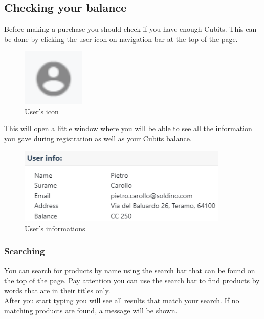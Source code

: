 		\subsection{Checking your balance}
		Before making a purchase you should check if you have enough Cubits\glo.
		This can be done by clicking the user icon on navigation bar at the top 
		of the page.
		\begin{figure}[H]
			\includegraphics[width=3cm]{res/images/user_icon.png}
			\centering
			\caption{User's icon}
		\end{figure}
		\noindent This will open a little window where you will be able to see 
		all the information you gave during registration as well as your Cubits 
		balance.
		\begin{figure}[H]
			\includegraphics[width=10cm]{res/images/user_info.png}
			\centering
			\caption{User's informations}
		\end{figure}
		\subsubsection{Searching}
		You can search for products by name using the search bar that can be 
		found on the top of the page. Pay attention you can use the search bar 
		to find products by words that are in their titles only. \\
		After you start typing you will see 
		all results that match your search. If no matching products are 
		found, a message will be shown.
%		
